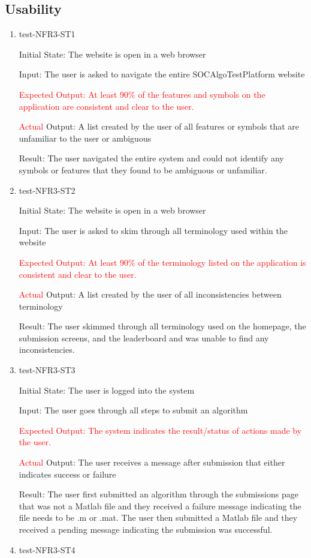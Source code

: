 \documentclass[12pt, titlepage]{article}
\begin{document}
\subsection{Usability}
\begin{enumerate}

\item{test-NFR3-ST1} \label{test-NFR3-ST1}

Initial State: The website is open in a web browser

Input: The user is asked to navigate the entire SOCAlgoTestPlatform website

\textcolor{red}{Expected Output: At least 90\% of the features and symbols on the application are consistent and clear to the user.}

\textcolor{red}{Actual} Output: A list created by the user of all features or symbols that are unfamiliar to the user or ambiguous

Result: The user navigated the entire system and could not identify any symbols or features that they found to be ambiguous or unfamiliar. 
\item{test-NFR3-ST2} \label{test-NFR3-ST2}

Initial State: The website is open in a web browser

Input: The user is asked to skim through all terminology used within the website

\textcolor{red}{Expected Output: At least 90\% of the terminology listed on the application is consistent and clear to the user.}

\textcolor{red}{Actual} Output: A list created by the user of all inconsistencies between terminology

Result: The user skimmed through all terminology used on the homepage, the submission screens, and the leaderboard and was unable to find any inconsistencies. 
\item{test-NFR3-ST3} \label{test-NFR3-ST3}

Initial State: The user is logged into the system

Input: The user goes through all steps to submit an algorithm

\textcolor{red}{Expected Output: The system indicates the result/status of actions made by the user.}

\textcolor{red}{Actual} Output: The user receives a message after submission that either indicates success or failure

Result: The user first submitted an algorithm through the submissions page that was not a Matlab file and they received a failure message indicating the file needs to be .m or .mat. The user then submitted a Matlab file and they received a pending message indicating the submission was successful. 
\item{test-NFR3-ST4} \label{test-NFR3-ST4}


\end{enumerate}
\end{document}
